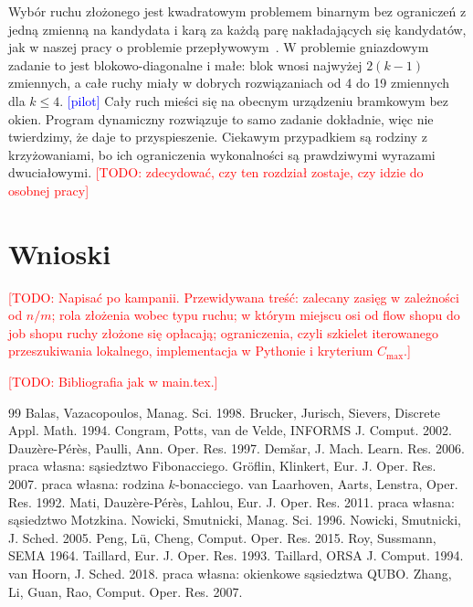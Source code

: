 \documentclass[10pt,twocolumn]{article}
\newcommand{\todo}[1]{\textcolor{red}{[TODO: #1]}}
\newcommand{\pilot}{\textcolor{blue}{[pilot]}}
\newcommand{\Cmax}{C_{\max}}
\begin{document}
Wybór ruchu złożonego jest kwadratowym problemem binarnym bez ograniczeń
z jedną zmienną na kandydata i karą za każdą parę nakładających się
kandydatów, jak w naszej pracy o problemie
przepływowym~\cite{windowed_own}. W problemie gniazdowym zadanie to jest
blokowo-diagonalne i małe: blok wnosi najwyżej $2(k-1)$ zmiennych,
a całe ruchy miały w dobrych rozwiązaniach od 4 do 19 zmiennych dla
$k\le4$. \pilot{} Cały ruch mieści się na obecnym urządzeniu bramkowym
bez okien. Program dynamiczny rozwiązuje to samo zadanie dokładnie, więc
nie twierdzimy, że daje to przyspieszenie. Ciekawym przypadkiem są rodziny
z krzyżowaniami, bo ich ograniczenia wykonalności są prawdziwymi wyrazami
dwuciałowymi. \todo{zdecydować, czy ten rozdział zostaje, czy idzie do
osobnej pracy}

\section{Wnioski}

\todo{Napisać po kampanii. Przewidywana treść: zalecany zasięg
w zależności od $n/m$; rola złożenia wobec typu ruchu; w którym miejscu
osi od flow shopu do job shopu ruchy złożone się opłacają; ograniczenia,
czyli szkielet iterowanego przeszukiwania lokalnego, implementacja
w Pythonie i kryterium $\Cmax$.}

\todo{Bibliografia jak w main.tex.}
\begin{thebibliography}{99}\small
{} Balas, Vazacopoulos, Manag. Sci. 1998.
 Brucker, Jurisch, Sievers, Discrete Appl. Math. 1994.
 Congram, Potts, van de Velde, INFORMS J. Comput. 2002.
 Dauz\`ere-P\'er\`es, Paulli, Ann. Oper. Res. 1997.
 Dem\v{s}ar, J. Mach. Learn. Res. 2006.
 praca własna: sąsiedztwo Fibonacciego.
 Gr\"oflin, Klinkert, Eur. J. Oper. Res. 2007.
 praca własna: rodzina $k$-bonacciego.
 van Laarhoven, Aarts, Lenstra, Oper. Res. 1992.
 Mati, Dauz\`ere-P\'er\`es, Lahlou, Eur. J. Oper. Res. 2011.
 praca własna: sąsiedztwo Motzkina.
 Nowicki, Smutnicki, Manag. Sci. 1996.
 Nowicki, Smutnicki, J. Sched. 2005.
 Peng, L\"u, Cheng, Comput. Oper. Res. 2015.
 Roy, Sussmann, SEMA 1964.
 Taillard, Eur. J. Oper. Res. 1993.
 Taillard, ORSA J. Comput. 1994.
 van Hoorn, J. Sched. 2018.
 praca własna: okienkowe sąsiedztwa QUBO.
 Zhang, Li, Guan, Rao, Comput. Oper. Res. 2007.
\end{thebibliography}
\end{document}
